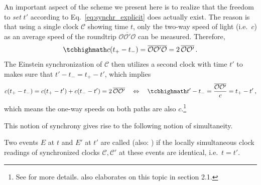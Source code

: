 \documentclass[../relativity_main.tex]{subfiles}
\begin{document}
An important aspect of the scheme we present here is to realize that the freedom to \emph{set} $t'$ according to Eq.~\eqref{eq:synchr_explicit} does actually exist. The reason is that using a single clock $\mathcal{C}$ showing time $t$, only the two-way speed of light (i.e.~$c$) as an average speed of the roundtrip $\overline{\mathcal{O} \mathcal{O}' \mathcal{O}}$ can be measured. Therefore, 
\begin{equation}\label{eq:two_way_light_speed}
	\eqbox{
	c (t_+ - t_-) = \overline{\mathcal{O} \mathcal{O}' \mathcal{O}} = 2 \, \overline{\mathcal{O} \mathcal{O}'}
	} \, .
\end{equation}
The Einstein synchronization of $\mathcal{C}$ then utilizes a second clock with time $t'$ to makes sure that $t' - t_- = t_+ - t'$, which implies
\begin{equation}\label{eq:one_way_light_speed}
	 c (t_+ - t_-) = c (t_+ - t') + c (t_- - t') = 2 \, \overline{\mathcal{O} \mathcal{O}'}
	\quad \Leftrightarrow \quad
	\eqbox{
	t' - t_- = \frac{\overline{\mathcal{O} \mathcal{O}'}}{c} = t_+ - t'
	} \, ,
\end{equation}
which means the one-way speeds on both paths are also $c$.\footnote{See \cite{Minguzzi_2003} for more details. \cite{giulini_srt} also elaborates on this topic in section 2.1.}


This notion of synchrony gives rise to the following notion of simultaneity.
\begin{defi}[Simultaneity]\label{defi:simultaneity}
	Two events $E$ at $t$ and $E'$ at $t'$ are called  (also: ) if the locally simultaneous clock readings of synchronized clocks $\mathcal{C}, \mathcal{C}'$ at these events are identical, i.e.~$t = t'$.
\end{defi}
\end{document}
